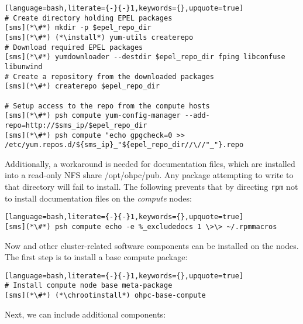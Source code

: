 \begin{lstlisting}[language=bash,literate={-}{-}1,keywords={},upquote=true]
# Create directory holding EPEL packages
[sms](*\#*) mkdir -p $epel_repo_dir
[sms](*\#*) (*\install*) yum-utils createrepo
# Download required EPEL packages
[sms](*\#*) yumdownloader --destdir $epel_repo_dir fping libconfuse libunwind
# Create a repository from the downloaded packages
[sms](*\#*) createrepo $epel_repo_dir

# Setup access to the repo from the compute hosts
[sms](*\#*) psh compute yum-config-manager --add-repo=http://$sms_ip/$epel_repo_dir
[sms](*\#*) psh compute "echo gpgcheck=0 >> /etc/yum.repos.d/${sms_ip}_"${epel_repo_dir//\//"_"}.repo
\end{lstlisting}


\noindent Additionally, a workaround is needed for \OHPC{} documentation files,
which are installed into a read-only NFS share /opt/ohpc/pub. Any package
attempting to write to that directory will fail to install. The following
prevents that by directing \texttt{rpm} not to install documentation files on
the {\em compute} nodes: 

\begin{lstlisting}[language=bash,literate={-}{-}1,keywords={},upquote=true]
[sms](*\#*) psh compute echo -e %_excludedocs 1 \>\> ~/.rpmmacros
\end{lstlisting}

\noindent Now \OHPC{} and other cluster-related software components can be
installed on the nodes. The first step is to install a base compute package:
\begin{lstlisting}[language=bash,literate={-}{-}1,keywords={},upquote=true]
# Install compute node base meta-package
[sms](*\#*) (*\chrootinstall*) ohpc-base-compute
\end{lstlisting}

\noindent Next, we can include additional components:
